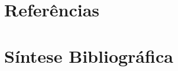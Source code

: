 \documentclass[
    12pt,               %
    a4paper,            %
    english,            %
    brazil,             %
    ]{article}
\begin{document}

\newpage
\section{Referências}
    \vspace{-4.3em}
    \renewcommand\refname{}
    

\section{Síntese Bibliográfica}


\end{document}
